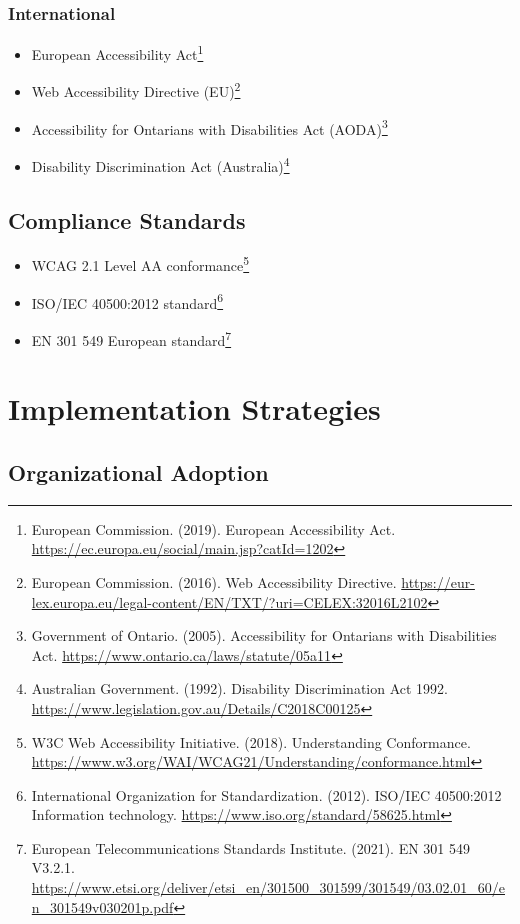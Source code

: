 \subsubsection{International}
\begin{itemize}
\item European Accessibility Act\footnote{European Commission. (2019). European Accessibility Act. \url{https://ec.europa.eu/social/main.jsp?catId=1202}}
\item Web Accessibility Directive (EU)\footnote{European Commission. (2016). Web Accessibility Directive. \url{https://eur-lex.europa.eu/legal-content/EN/TXT/?uri=CELEX:32016L2102}}
\item Accessibility for Ontarians with Disabilities Act (AODA)\footnote{Government of Ontario. (2005). Accessibility for Ontarians with Disabilities Act. \url{https://www.ontario.ca/laws/statute/05a11}}
\item Disability Discrimination Act (Australia)\footnote{Australian Government. (1992). Disability Discrimination Act 1992. \url{https://www.legislation.gov.au/Details/C2018C00125}}
\end{itemize}

\subsection{Compliance Standards}
\begin{itemize}
\item WCAG 2.1 Level AA conformance\footnote{W3C Web Accessibility Initiative. (2018). Understanding Conformance. \url{https://www.w3.org/WAI/WCAG21/Understanding/conformance.html}}
\item ISO/IEC 40500:2012 standard\footnote{International Organization for Standardization. (2012). ISO/IEC 40500:2012 Information technology. \url{https://www.iso.org/standard/58625.html}}
\item EN 301 549 European standard\footnote{European Telecommunications Standards Institute. (2021). EN 301 549 V3.2.1. \url{https://www.etsi.org/deliver/etsi_en/301500_301599/301549/03.02.01_60/en_301549v030201p.pdf}}
\end{itemize}

\section{Implementation Strategies}
\label{sec:implementation-strategies}

\subsection{Organizational Adoption}

